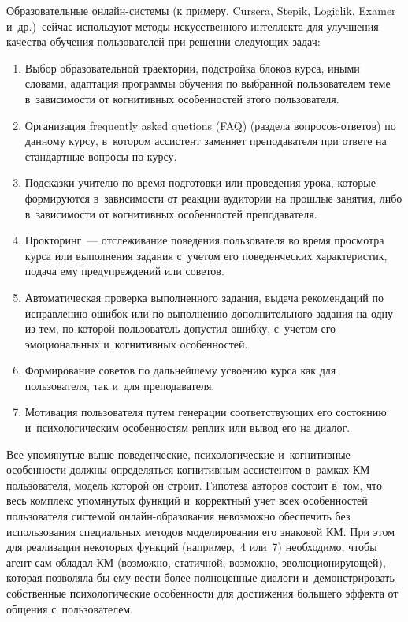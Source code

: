 \begin{multicols}{2}
  Образовательные он\-лайн-сис\-те\-мы (к примеру, Cursera, Stepik, Logiclik, 
Examer и~др.)\ сейчас используют методы искусственного интеллекта для 
улучшения качества обучения пользователей при решении следующих задач:
\begin{enumerate}[1.]
\item Выбор образовательной траектории, подстройка блоков курса, иными 
словами, адаптация программы обучения по выбранной пользователем теме 
в~зависимости от когнитивных особенностей этого пользователя.
\item Организация frequently asked quetions (FAQ) (раздела во\-про\-сов-от\-ве\-тов) по данному курсу, 
в~котором ассистент заменяет преподавателя при ответе на стандартные 
вопросы по курсу.
\item Подсказки учителю по время подготовки или проведения урока, которые 
формируются в~зависимости от реакции аудитории на прошлые занятия, либо 
в~зависимости от когнитивных особенностей преподавателя.
\item Прокторинг~--- отслеживание поведения пользователя во время 
просмотра курса или выполнения задания с~учетом его поведенческих 
характеристик, подача ему предупреждений или советов.
\item Автоматическая проверка выполненного задания, выдача рекомендаций 
по исправлению ошибок или по выполнению дополнительного задания на одну 
из тем, по которой пользователь допустил ошибку, с~учетом его эмоциональных 
и~когнитивных особенностей.
\item Формирование советов по дальнейшему усвоению курса как для 
пользователя, так и~для преподавателя.
\item Мотивация пользователя путем генерации соответствующих его 
состоянию и~психологическим особенностям реплик или вывод его на диалог.
\end{enumerate}

  Все упомянутые выше поведенческие, психологические и~когнитивные 
особенности должны определяться когнитивным ассистентом в~рамках 
КМ пользователя, модель которой он строит. Гипотеза авторов состоит в~том, 
что весь комплекс упомянутых функций и~корректный учет всех особенностей 
пользователя системой он\-лайн-об\-ра\-зо\-ва\-ния невозможно обеспечить без 
использования специальных методов моделирования его знаковой 
КМ. При этом для реализации некоторых функций (например,~4 или~7) 
необходимо, чтобы агент сам обладал КМ (возможно, статичной, 
возможно, эволюционирующей), которая позволяла бы ему вести более 
полноценные диалоги и~демонстрировать собственные психологические 
особенности для достижения большего эффекта от общения с~пользователем.
  

\end{multicols}
